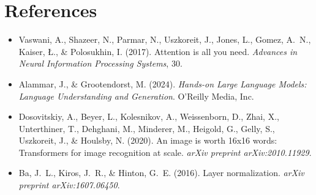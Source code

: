 \documentclass[11pt]{article}
\begin{document}
\section{References}

\begin{itemize}[nosep]
  \item Vaswani, A., Shazeer, N., Parmar, N., Uszkoreit, J., Jones, L., Gomez, A.~N., Kaiser, {\L}., \& Polosukhin, I. (2017). Attention is all you need. \emph{Advances in Neural Information Processing Systems}, 30.
  \item Alammar, J., \& Grootendorst, M. (2024). \emph{Hands-on Large Language Models: Language Understanding and Generation}. O'Reilly Media, Inc.
  \item Dosovitskiy, A., Beyer, L., Kolesnikov, A., Weissenborn, D., Zhai, X., Unterthiner, T., Dehghani, M., Minderer, M., Heigold, G., Gelly, S., Uszkoreit, J., \& Houlsby, N. (2020). An image is worth 16x16 words: Transformers for image recognition at scale. \emph{arXiv preprint arXiv:2010.11929}.
  \item Ba, J.~L., Kiros, J.~R., \& Hinton, G.~E. (2016). Layer normalization. \emph{arXiv preprint arXiv:1607.06450}.
\end{itemize}
\end{document}
